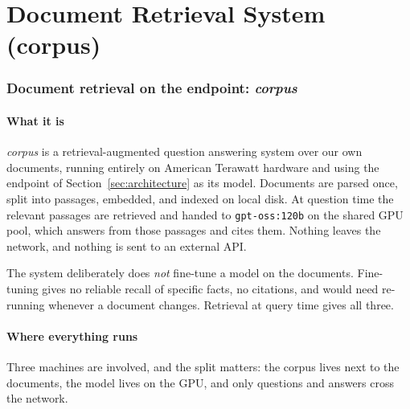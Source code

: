 \documentclass[11pt,a4paper]{article}
\newcommand{\cmd}[1]{\texttt{\small #1}}
\begin{document}
\part{Document Retrieval System (corpus)}

\section{Document retrieval on the endpoint: \textit{corpus}}
\label{sec:corpus}

\subsection{What it is}
\textit{corpus} is a retrieval-augmented question answering system over our own
documents, running entirely on American Terawatt hardware and using the
endpoint of Section~\ref{sec:architecture} as its model. Documents are parsed
once, split into passages, embedded, and indexed on local disk. At question
time the relevant passages are retrieved and handed to \cmd{gpt-oss:120b} on
the shared GPU pool, which answers from those passages and cites them. Nothing
leaves the network, and nothing is sent to an external API.

The system deliberately does \emph{not} fine-tune a model on the documents.
Fine-tuning gives no reliable recall of specific facts, no citations, and would
need re-running whenever a document changes. Retrieval at query time gives all
three.

\subsection{Where everything runs}
Three machines are involved, and the split matters: the corpus lives next to
the documents, the model lives on the GPU, and only questions and answers cross
the network.
\end{document}

